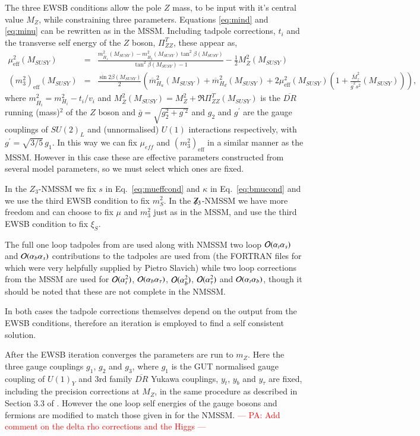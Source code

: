 \documentclass[final,3p,times,pdflatex]{elsarticle}
\newcommand{\ba}{\begin{eqnarray}}
\newcommand{\ea}{\end{eqnarray}}
\newcommand{\Zv}{{\mbox{${\not\!\!Z_3}$}}}
\def\at{\alpha_t}
\def\ab{\alpha_b}
\def\as{\alpha_s}
\def\atau{\alpha_{\tau}}
\def\oatab{{\cal O}(\at\ab)}
\def\oatas{{\cal O}(\at\as)}
\def\oabas{{\cal O}(\ab\as)}
\def\oatq{{\cal O}(\at^2)}
\def\oabq{{\cal O}(\ab^2)}
\def\oatauq{{\cal O}(\atau^2)}
\def\oabatau{{\cal O}(\ab \atau)}
\begin{document}
   The three EWSB conditions allow the pole $Z$ mass, to be input with
   it's central value $M_Z$, while constraining three parameters.
   Equations \ref{eq:mind} and \ref{eq:minu} can be rewritten as in
   the MSSM.  Including tadpole corrections, $t_i$ and the transverse
   self energy of the $Z$ boson, $\Pi^T_{ZZ}$, these appear as, \ba
   \mu_\textrm{eff}^2(M_{SUSY}) &=&
   \frac{m_{\overline{H}_1}^2(M_{SUSY}) -
     m_{\overline{H}_2}^2(M_{SUSY}) \tan^2 \beta(M_{SUSY})}{\tan^2
     \beta(M_{SUSY}) - 1} - \frac{1}{2} M_{\overline Z}^2
   (M_{SUSY})\label{eq:mueffcond}\\ (m^2_3)_\textrm{eff}(M_{SUSY})&=&\frac{\sin{2\beta}(M_{SUSY})}{2}\left(\overline{m}_{H_u}^2(M_{SUSY})+\overline{m}_{H_d}^2(M_{SUSY})+
   2\mu_\textrm{eff}^2(M_{SUSY})\left(1+\frac{\overline{M}_z^2}{\overline{g}^2s^2}(M_{SUSY})\right)\right),\label{eq:bmucond}
   \ea where $m_{\overline{H}_i}^2 = m_{H_i}^2 - t_i/v_i$ and
   $M_{\overline Z}^2(M_{SUSY}) = M_Z^2 + \Re\Pi_{ZZ}^T(M_{SUSY})$ is
   the $\overline{DR}$ running (mass)$^2$ of the $Z$ boson and $\bar g
   = \sqrt{g_2^2+g^{\prime 2}}$ and $g_2$ and $g^{\prime}$ are the
   gauge couplings of $SU(2)_L$ and (unnormalised) $U(1)$ interactions
   respectively, with $g^\prime = \sqrt{3/5} \, g_1$.  In this way we
   can fix $\mu_{eff}$ and $(m^2_3)_\textrm{eff}$ in a similar manner
   as the MSSM.  However in this case these are effective parameters
   constructed from several model parameters, so we must select which
   ones are fixed.

In the $Z_3$-NMSSM we fix $s$ in Eq.~\ref{eq:mueffcond} and $\kappa$
in Eq.~\ref{eq:bmucond} and we use the third EWSB condition to fix
$m_S^2$.  In the \Zv-NMSSM we have more freedom and can choose to fix
$\mu$ and $m_3^2$ just as in the MSSM, and use the third EWSB
condition to fix $\xi_S$.

The full one loop tadpoles from \cite{Degrassi:2009yq} are used along
with NMSSM two loop $\oatas$ and $\oabas$ contributions to the
tadpoles are used from \cite{Degrassi:2009yq} (the FORTRAN files for
which were very helpfully supplied by Pietro Slavich) while two loop
corrections from the MSSM are used for $\oatq$, $\oabatau$, $\oabq$,
$\oatauq$ and $\oatab$, though it should be noted that these are not
complete in the NMSSM.
 
In both cases the tadpole corrections themselves depend on the output
from the EWSB conditions, therefore an iteration is employed to find a
self consistent solution.

After the EWSB iteration converges the parameters are run to $m_Z$.
Here the three gauge couplings $g_1$, $g_2$ and $g_3$, where $g_1$ is
the GUT normalised gauge coupling of $U(1)_Y$ and 3rd family
$\overline{DR}$ Yukawa couplings, $y_t$, $y_b$ and $y_\tau$ are fixed,
including the precision corrections at $M_Z$, in the same procedure as
described in Section 3.3 of \cite{Allanach:2001kg}.  However the one
loop self energies of the gauge bosons and fermions are modified to
match those given in \cite{Degrassi:2009yq} for the NMSSM.
\textcolor{red}{--- PA: Add comment on the delta rho corrections and
  the Higgs ---}
\end{document}
